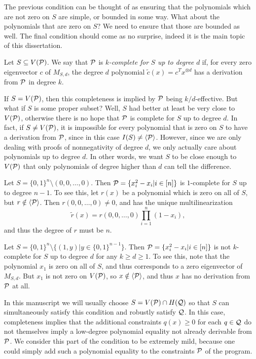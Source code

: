The previous condition can be thought of as ensuring that the polynomials which are not zero on $S$ are simple, or bounded in some way. What about the polynomials that are zero on $S$? We need to ensure that those are bounded as well. The final condition should come as no surprise, indeed it is the main topic of this dissertation. 
\begin{definition}
Let $S \subseteq V(\mathcal P)$. We say that $\mathcal P$ is \emph{$k$-complete for $S$ up to degree $d$} if, for every zero eigenvector $c$ of $M_{S,d}$, the degree $d$ polynomial $\tilde{c}(x) = c^Tx^{\otimes d}$ has a derivation from $\mathcal P$ in degree $k$.
\end{definition}
If $S = V(\mathcal P)$, then this completeness is implied by $\mathcal P$ being $k/d$-effective. 
But what if $S$ is some proper subset? Well, $S$ had better at least be very close to $V(\mathcal P)$, otherwise there is no hope that $\mathcal P$ is complete for $S$ up to degree $d$. In fact, if $S \neq V(\mathcal P)$, it is impossible for every polynomial that is zero on $S$ to have a derivation from $\mathcal P$, since in this case $I(S) \neq \langle \mathcal P \rangle$. However, since we are only dealing with proofs of nonnegativity of degree $d$, we only actually care about polynomials up to degree $d$. In other words, we want $S$ to be close enough to $V(\mathcal P)$ that only polynomials of degree higher than $d$ can tell the difference.
\begin{example}
Let $S = \{0,1\}^n \setminus (0,0,\dots,0)$. Then $\mathcal P = \{x_i^2 - x_i | i \in [n]\}$ is $1$-complete for $S$ up to degree $n-1$. To see this, let $r(x)$ be a polynomial which is zero on all of $S$, but $r \notin \langle \mathcal P \rangle$. Then $r(0,0,\dots,0) \neq 0$, and has the unique multilinearization 
\[\tilde{r}(x) = r(0,0,\dots,0)\prod_{i=1}^n \left(1-x_i\right),\]
and thus the degree of $r$ must be $n$.
\end{example}
\begin{example}\label{ex:not-complete}
Let $S = \{0,1\}^n \setminus \{(1,y) | y \in \{0,1\}^{n-1}\}$. Then $\mathcal P = \{x_i^2 - x_i | i \in [n]\}$ is not $k$-complete for $S$ up to degree $d$ for any $k \geq d \geq 1$. To see this, note that the polynomial $x_1$ is zero on all of $S$, and thus corresponds to a zero eigenvector of $M_{S,d}$. But $x_1$ is not zero on $V(\mathcal P)$, so $x \notin \langle \mathcal P \rangle$, and thus $x$ has no derivation from $\mathcal P$ at all. 
\end{example}
In this manuscript we will usually choose $S = V(\mathcal P) \cap H(\mathcal Q)$ so that $S$ can simultaneously satisfy this condition and robustly satisfy $\mathcal Q$. In this case, completeness implies that the additional constraints $q(x) \geq 0$ for each $q \in \mathcal Q$ do not themselves imply a low-degree polynomial equality not already derivable from $\mathcal P$. We consider this part of the condition to be extremely mild, because one could simply add such a polynomial equality to the constraints $\mathcal P$ of the program. 
